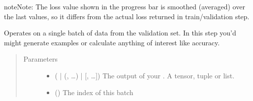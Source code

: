 \documentclass[letterpaper,10pt,english]{sphinxmanual}
\begin{document}
\begin{fulllineitems}
\begin{fulllineitems}
\begin{sphinxadmonition}{note}{Note:}
\sphinxAtStartPar
The loss value shown in the progress bar is smoothed (averaged) over the last values,
so it differs from the actual loss returned in train/validation step.
\end{sphinxadmonition}

\end{fulllineitems}


\begin{fulllineitems}
\label{\detokenize{pages/ml:vipercore.ml.plmodels.MultilabelSupervisedModel.validation_step}}
\sphinxAtStartPar
Operates on a single batch of data from the validation set.
In this step you’d might generate examples or calculate anything of interest like accuracy.

\begin{sphinxVerbatim}[commandchars=\\\{\}]
  \PYG{p}{[}\PYG{p}{]}
   
      
\end{sphinxVerbatim}
\begin{quote}\begin{description}
\item[{Parameters}] \leavevmode\begin{itemize}
\item {} 
\sphinxAtStartPar
{} ( | (, …) | {[}, …{]}) \textendash{} The output of your . A tensor, tuple or list.

\item {} 
\sphinxAtStartPar
{} () \textendash{} The index of this batch


\end{itemize}
\end{description}
\end{quote}
\end{fulllineitems}
\end{fulllineitems}
\end{document}
